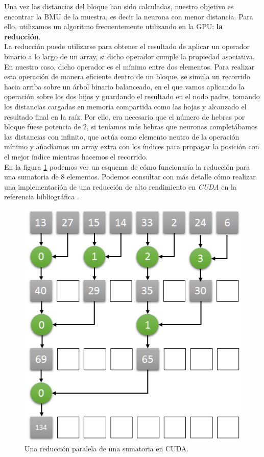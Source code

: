    
Una vez las distancias del bloque han sido calculadas, nuestro objetivo es encontrar la BMU de la muestra, es decir la neurona con menor distancia. Para ello, utilizamos un algoritmo frecuentemente utilizando en la GPU: \textbf{la reducción}. \\

La reducción puede utilizarse para obtener el resultado de aplicar un operador binario a lo largo de un array, si dicho operador cumple la propiedad asociativa. En nuestro caso, dicho operador es el mínimo entre dos elementos. Para realizar esta operación de manera eficiente dentro de un bloque, se simula un recorrido hacia arriba sobre un árbol binario balanceado, en el que vamos aplicando la operación sobre los dos hijos y guardando el resultado en el nodo padre, tomando los distancias cargadas en memoria compartida como las hojas y alcanzado el resultado final en la raíz. Por ello, era necesario que el número de hebras por bloque fuese potencia de 2, si teníamos más hebras que neuronas completábamos las distancias con infinito, que actúa como elemento neutro de la operación mínimo y añadíamos un array extra con los índices para propagar la posición con el mejor índice mientras hacemos el recorrido.\\

En la figura \ref{image:cudareduction} podemos ver un esquema de cómo funcionaría la reducción para una sumatoria de 8 elementos. Podemos consultar con más detalle cómo realizar una implementación de una reducción de alto rendimiento en \textit{CUDA} en la referencia bibliográfica \cite{reduction}.\\

\begin{figure}[ht]
\centering
\includegraphics[scale=0.5]{imagenes/parallel_reduce.png}
\caption{Una reducción paralela de una sumatoria en CUDA.}
\label{image:cudareduction}
\end{figure}

